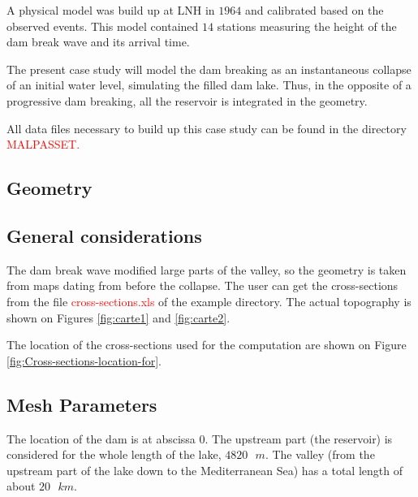 \documentclass[a4paper,12pt]{article}
\begin{document}
\vspace{0.5cm}

A physical model was build up at LNH in $1964$ and calibrated based
on the observed events. This model contained $14$ stations measuring
the height of the dam break wave and its arrival time.

\vspace{0.5cm}

The present case study will model the dam breaking as an instantaneous
collapse of an initial water level, simulating the filled dam lake. Thus, in
the opposite of a progressive dam breaking, all the reservoir is integrated in the geometry.

\vspace{0.5cm}

All data files necessary to build up this case study can be found
in the directory \textcolor{red}{MALPASSET.}


\subsection{Geometry}

\subsection{General considerations}

\hspace{0.5cm}The dam break wave modified large parts of the valley, so the geometry
is taken from maps dating from before the collapse. The user can get
the cross-sections from the file \textcolor{red}{cross-sections.xls}
of the example directory. The actual topography is shown on Figures
\ref{fig:carte1} and \ref{fig:carte2}.

\vspace{0.5cm}

The location of the cross-sections used for the computation are shown
on Figure \ref{fig:Cross-sections-location-for}.

\subsection{Mesh Parameters}

The location of the dam is at abscissa $0$. The upstream part (the reservoir)
is considered for the whole length of the lake, $4820\mbox{ }m$. The valley
(from the upstream part of the lake down to the Mediterranean Sea)
has a total length of about $20\mbox{ }km$.
\end{document}
